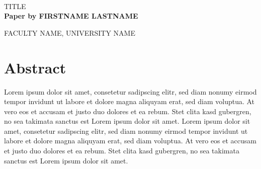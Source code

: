 \documentclass{article}
\begin{document}




\noindent\underline{}\\

\huge
\noindent TITLE\\


\normalsize
\noindent\textbf{Paper by FIRSTNAME LASTNAME }

\noindent FACULTY NAME, UNIVERSITY NAME\\


\section*{Abstract}

\noindent Lorem ipsum dolor sit amet, consetetur sadipscing elitr, sed diam nonumy eirmod
tempor invidunt ut labore et dolore magna aliquyam erat, sed diam voluptua. At vero eos et
accusam et justo duo dolores et ea rebum. Stet clita kasd gubergren, no sea takimata
sanctus est Lorem ipsum dolor sit amet. Lorem ipsum dolor sit amet, consetetur sadipscing
elitr, sed diam nonumy eirmod tempor invidunt ut labore et dolore magna aliquyam erat, sed
diam voluptua. At vero eos et accusam et justo duo dolores et ea rebum. Stet clita kasd
gubergren, no sea takimata sanctus est Lorem ipsum dolor sit amet.


\end{document}
